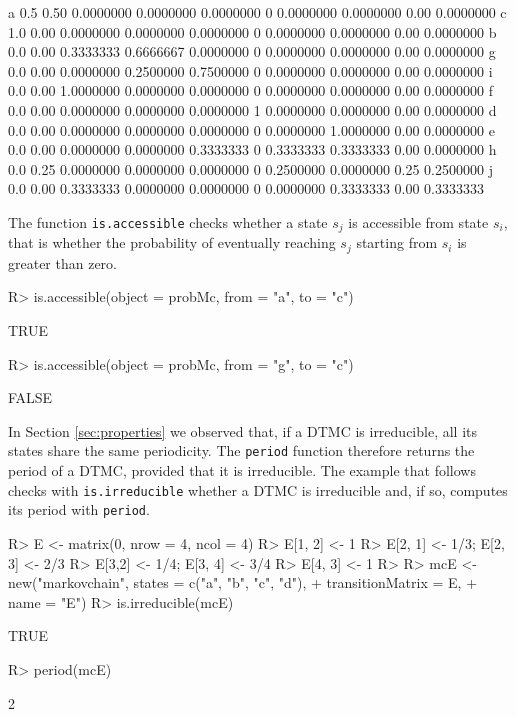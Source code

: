 \documentclass[
  nojss]{jss}
\begin{document}
\begin{CodeChunk}
\begin{CodeOutput}
a 0.5 0.50 0.0000000 0.0000000 0.0000000 0 0.0000000 0.0000000 0.00 0.0000000
c 1.0 0.00 0.0000000 0.0000000 0.0000000 0 0.0000000 0.0000000 0.00 0.0000000
b 0.0 0.00 0.3333333 0.6666667 0.0000000 0 0.0000000 0.0000000 0.00 0.0000000
g 0.0 0.00 0.0000000 0.2500000 0.7500000 0 0.0000000 0.0000000 0.00 0.0000000
i 0.0 0.00 1.0000000 0.0000000 0.0000000 0 0.0000000 0.0000000 0.00 0.0000000
f 0.0 0.00 0.0000000 0.0000000 0.0000000 1 0.0000000 0.0000000 0.00 0.0000000
d 0.0 0.00 0.0000000 0.0000000 0.0000000 0 0.0000000 1.0000000 0.00 0.0000000
e 0.0 0.00 0.0000000 0.0000000 0.3333333 0 0.3333333 0.3333333 0.00 0.0000000
h 0.0 0.25 0.0000000 0.0000000 0.0000000 0 0.2500000 0.0000000 0.25 0.2500000
j 0.0 0.00 0.3333333 0.0000000 0.0000000 0 0.0000000 0.3333333 0.00 0.3333333
\end{CodeOutput}
\end{CodeChunk}

The function \texttt{is.accessible} checks whether a state \(s_{j}\) is accessible from state \(s_i\), that is whether the probability of eventually reaching \(s_j\) starting from \(s_{i}\) is greater than zero.

\begin{CodeChunk}
\begin{CodeInput}
R> is.accessible(object = probMc, from = "a", to = "c")
\end{CodeInput}
\begin{CodeOutput}
[1] TRUE
\end{CodeOutput}
\begin{CodeInput}
R> is.accessible(object = probMc, from = "g", to = "c")
\end{CodeInput}
\begin{CodeOutput}
[1] FALSE
\end{CodeOutput}
\end{CodeChunk}

In Section \ref{sec:properties} we observed that, if a DTMC is irreducible, all its states share the same periodicity. The \texttt{period} function therefore returns the period of a DTMC, provided that it is irreducible. The example that follows checks with \texttt{is.irreducible} whether a DTMC is irreducible and, if so, computes its period with \texttt{period}.

\begin{CodeChunk}
\begin{CodeInput}
R> E <- matrix(0, nrow = 4, ncol = 4)
R> E[1, 2] <- 1
R> E[2, 1] <- 1/3; E[2, 3] <- 2/3
R> E[3,2] <- 1/4; E[3, 4] <- 3/4
R> E[4, 3] <- 1
R> 
R> mcE <- new("markovchain", states = c("a", "b", "c", "d"), 
+       transitionMatrix = E, 
+       name = "E")
R> is.irreducible(mcE)
\end{CodeInput}
\begin{CodeOutput}
[1] TRUE
\end{CodeOutput}
\begin{CodeInput}
R> period(mcE)
\end{CodeInput}
\begin{CodeOutput}
[1] 2
\end{CodeOutput}
\end{CodeChunk}
\end{document}
